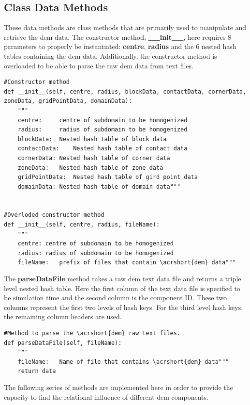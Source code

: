 \subsection{Class Data Methods}

These data methods are class methods that are primarily used to manipulate and retrieve the \acrshort{dem} data. The constructor method, \textbf{\_\_init\_\_}, here requires 8 parameters to properly be instantiated: \textbf{centre}, \textbf{radius} and the 6 nested hash tables containing the \acrshort{dem} data. Additionally, the constructor method is overloaded to be able to parse the raw \acrshort{dem} data from text files.

\begin{lstlisting}[frame=single] 
#Constructor method
def __init__(self, centre, radius, blockData, contactData, cornerData, zoneData, gridPointData, domainData):
	"""
	centre:		centre of subdomain to be homogenized
	radius:		radius of subdomain to be homogenized
	blockData:	Nested hash table of block data
	contactData:	Nested hash table of contact data
	cornerData:	Nested hash table of corner data
	zoneData:	Nested hash table of zone data
	gridPointData:	Nested hash table of gird point data
	domainData:	Nested hash table of domain data"""
	
	
#Overloded constructor method
def __init__(self, centre, radius, fileName):
	"""
	centre:	centre of subdomain to be homogenized
	radius:	radius of subdomain to be homogenized
	fileName:	prefix of files that contain \acrshort{dem} data"""
\end{lstlisting}
	
The \textbf{parseDataFile} method takes a raw \acrshort{dem} text data file and returns a triple level nested hash table. Here the first column of the text data file is specified to be simulation time and the second column is the component ID. These two columns represent the first two levels of hash keys. For the third level hash keys, the remaining column headers are used. 
	
\begin{lstlisting}[frame=single] 
#Method to parse the \acrshort{dem} raw text files.
def parseDataFile(self, fileName):
	"""
	fileName:	Name of file that contains \acrshort{dem} data"""
	return data
\end{lstlisting}

The following series of methods are implemented here in order to provide the capacity to find the relational influence of different \acrshort{dem} components. 

